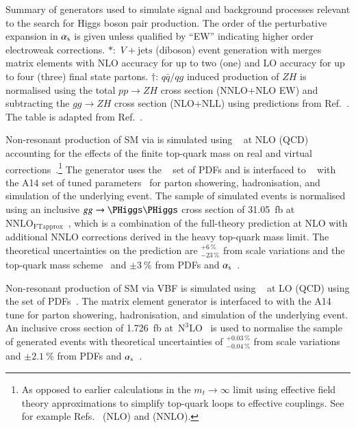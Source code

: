 \begin{sidewaystable}[p]
  \centering

  \caption{Summary of generators used to simulate signal and
    background processes relevant to the search for Higgs boson pair
    production. The order of the perturbative expansion in $\alpha_{\text{s}}$
    is given unless qualified by ``EW'' indicating higher order
    electroweak corrections. $*$:~$V+\text{jets}$ (diboson) event
    generation with \SHERPA[2.2.1] merges matrix elements with NLO
    accuracy for up to two (one) and LO accuracy for up to four
    (three) final state partons. $\dagger$: $q\bar{q} / qg$ induced
    production of $ZH$ is normalised using the total $pp \to ZH$ cross
    section (NNLO+NLO EW) and subtracting the $gg \to ZH$ cross
    section (NLO+NLL) using predictions from
    Ref.~\cite{deFlorian:2016spz}. The table is adapted from
    Ref.~\cite{ATLAS-CONF-2021-030}.}%
  \label{tab:monte_carlo}

  \resizebox{\textwidth}{!}{}
\end{sidewaystable}

Non-resonant production of SM \HH via \ggF is simulated using
\POWHEGBOX[v2]~\cite{Nason:2004rx,Frixione:2007vw,Alioli:2010xd} at
NLO (QCD) accounting for the effects of the finite top-quark mass on
real and virtual
corrections~\cite{Borowka:2016ehy,Baglio:2018lrj,Heinrich:2017kxx,Heinrich:2019bkc,Heinrich:2020ckp}.\footnote{As
  opposed to earlier calculations in the $m_{t} \to \infty$ limit
  using effective field theory approximations to simplify top-quark
  loops to effective couplings. See for example
  Refs.~\cite{Dawson:1998py} (NLO) and \cite{deFlorian:2013jea}
  (NNLO).} The generator uses the
\PDFforLHC[15nlo]~\cite{Butterworth:2015oua} set of PDFs and is
interfaced to \PYTHIA[8]~\cite{Sjostrand:2014zea} with the A14 set of
tuned parameters~\cite{ATL-PHYS-PUB-2014-021} for parton showering,
hadronisation, and simulation of the underlying event. The sample of
simulated events is normalised using an inclusive $gg \to \HH$ cross
section of \SI{31.05}{\femto\barn} at
$\text{NNLO}_{\text{FTapprox}}$~\cite{Grazzini:2018bsd}, which is a
combination of the full-theory prediction at NLO with additional NNLO
corrections derived in the heavy top-quark mass limit. The theoretical
uncertainties on the prediction are $^{+6\,\%}_{-23\,\%}$ from scale
variations and the top-quark mass scheme~\cite{Baglio:2020wgt} and
$\pm\SI{3}{\percent}$ from PDFs and $\alpha_{\text{s}}$~\cite{LHCHWGHH}.

Non-resonant production of SM \HH via VBF is simulated using
\MGNLO~\cite{Alwall:2014hca} %
at LO (QCD) %
using the \NNPDF[3.0nlo] set of PDFs~\cite{Ball:2014uwa}. The matrix
element generator is interfaced to \PYTHIA[8] with the A14 tune for
parton showering, hadronisation, and simulation of the underlying
event. An inclusive cross section of \SI{1.726}{\femto\barn}
at~$\text{N}^3\text{LO}$~\cite{Dreyer:2018qbw,LHCHWGHH} is used to
normalise the sample of generated events with theoretical
uncertainties of $^{+0.03\,\%}_{-0.04\,\%}$ from scale variations and
$\pm\SI{2.1}{\percent}$ from PDFs and $\alpha_{\text{s}}$~\cite{LHCHWGHH}.

